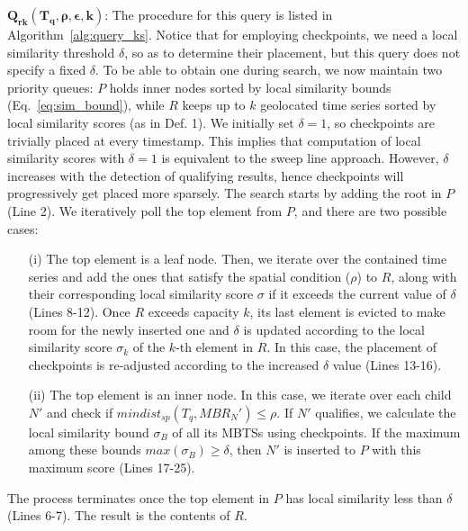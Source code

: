 \noindent $\mathbold{Q_{rk}(T_q, \rho, \epsilon, k)}$: The procedure for this query is listed in Algorithm~\ref{alg:query_ks}. Notice that for employing checkpoints, we need a local similarity threshold $\delta$, so as to determine their placement, but this query does not specify a fixed $\delta$. To be able to obtain one during search, we now maintain two priority queues: $P$ holds inner nodes sorted by local similarity bounds (Eq.~\ref{eq:sim_bound}), while $R$ keeps up to $k$ geolocated time series sorted by local similarity scores (as in Def. 1). We initially set $\delta=1$, so checkpoints are trivially placed at every timestamp. This implies that computation of local similarity scores with $\delta=1$ is equivalent to the sweep line approach. However, $\delta$ increases with the detection of qualifying results, hence checkpoints will progressively get placed more sparsely. The search starts by adding the \btsr root in $P$ (Line 2). We iteratively poll the top element from $P$, and there are two possible cases:
\begin{enumerate}
\item[(i)] The top element is a leaf node. Then, we iterate over the contained time series and add the ones that satisfy the spatial condition ($\rho$) to $R$, along with their corresponding local similarity score $\sigma$ if it exceeds the current value of $\delta$ (Lines 8-12).
Once $R$ exceeds capacity $k$, its last element is evicted to make room for the newly inserted one and $\delta$ is updated according to the local similarity score $\sigma_k$ of the $k$-th element in $R$. In this case, the placement of checkpoints is re-adjusted according to the increased $\delta$ value (Lines 13-16).

\item[(ii)] The top element is an inner node. In this case, we iterate over each child $N'$ and check if $mindist_{sp}(T_q, {MBR_N'}) \leq \rho$. If $N'$ qualifies, we calculate the local similarity bound $\sigma_B$ of all its MBTSs using checkpoints. If the maximum among these bounds $max(\sigma_B) \geq \delta$, then $N'$ is inserted to $P$ with this maximum score (Lines 17-25).
\end{enumerate}

The process terminates once the top element in $P$ has local similarity less than $\delta$ (Lines 6-7). The result is the contents of $R$.

